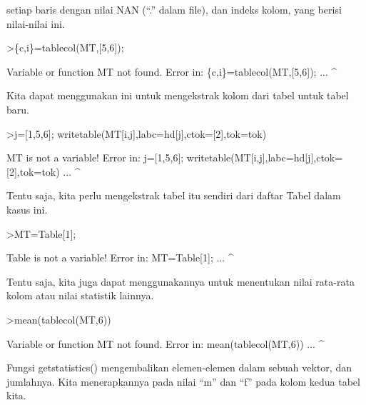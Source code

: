 \documentclass[a4paper,10pt]{article}
\begin{document}
\begin{eulernotebook}
\begin{eulercomment}
\begin{eulercomment}
\begin{eulercomment}
\begin{eulercomment}
\begin{eulercomment}
\begin{eulercomment}
\begin{eulercomment}
\begin{eulercomment}
\begin{eulercomment}
\begin{eulercomment}
\begin{eulercomment}
\begin{eulercomment}
\begin{eulercomment}
\begin{eulercomment}
\begin{eulercomment}
\begin{eulercomment}
\begin{eulercomment}
\begin{eulercomment}
\begin{eulercomment}
setiap baris dengan nilai NAN (“.” dalam file), dan indeks kolom, yang
berisi nilai-nilai ini.
\end{eulercomment}
\begin{eulerprompt}
>\{c,i\}=tablecol(MT,[5,6]);
\end{eulerprompt}
\begin{euleroutput}
  Variable or function MT not found.
  Error in:
  \{c,i\}=tablecol(MT,[5,6]); ...
                   ^
\end{euleroutput}
\begin{eulercomment}
Kita dapat menggunakan ini untuk mengekstrak kolom dari tabel untuk
tabel baru.
\end{eulercomment}
\begin{eulerprompt}
>j=[1,5,6]; writetable(MT[i,j],labc=hd[j],ctok=[2],tok=tok)
\end{eulerprompt}
\begin{euleroutput}
  MT is not a variable!
  Error in:
  j=[1,5,6]; writetable(MT[i,j],labc=hd[j],ctok=[2],tok=tok) ...
                               ^
\end{euleroutput}
\begin{eulercomment}
Tentu saja, kita perlu mengekstrak tabel itu sendiri dari daftar Tabel
dalam kasus ini.
\end{eulercomment}
\begin{eulerprompt}
>MT=Table[1];
\end{eulerprompt}
\begin{euleroutput}
  Table is not a variable!
  Error in:
  MT=Table[1]; ...
             ^
\end{euleroutput}
\begin{eulercomment}
Tentu saja, kita juga dapat menggunakannya untuk menentukan nilai
rata-rata kolom atau nilai statistik lainnya.
\end{eulercomment}
\begin{eulerprompt}
>mean(tablecol(MT,6))
\end{eulerprompt}
\begin{euleroutput}
  Variable or function MT not found.
  Error in:
  mean(tablecol(MT,6)) ...
                  ^
\end{euleroutput}
\begin{eulercomment}
Fungsi getstatistics() mengembalikan elemen-elemen dalam sebuah
vektor, dan jumlahnya. Kita menerapkannya pada nilai “m” dan “f” pada
kolom kedua tabel kita.
\end{eulercomment}

\end{eulercomment}
\end{eulercomment}
\end{eulercomment}
\end{eulercomment}
\end{eulercomment}
\end{eulercomment}
\end{eulercomment}
\end{eulercomment}
\end{eulercomment}
\end{eulercomment}
\end{eulercomment}
\end{eulercomment}
\end{eulercomment}
\end{eulercomment}
\end{eulercomment}
\end{eulercomment}
\end{eulercomment}
\end{eulercomment}
\end{eulernotebook}
\end{document}
